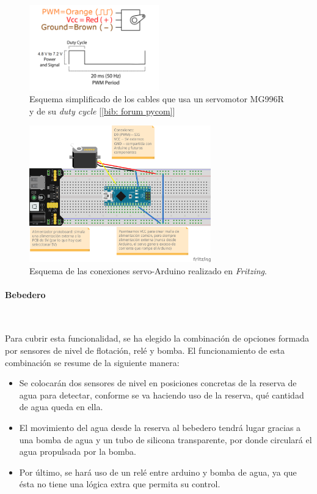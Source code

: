 \documentclass[12pt]{article}
\newcommand{\subsubsubsection}[1]{\paragraph{#1}\mbox{}\\}
\begin{document}
	\begin{figure}[h!]
		\begin{center}
			\includegraphics[width=0.5\textwidth]{img/servo_dutyCycle.png}
			\caption{Esquema simplificado de los cables que usa un servomotor MG996R y de su \textit{duty cycle} [\ref{bib: forum pycom}]}
			\label{Esquema conexiones servo}
		\end{center}
	\end{figure}
	
	\begin{figure}[h!]
		\begin{center}
			\includegraphics[width=0.7\textwidth]{img/servo_connections_v2_fritzing.png}
			\caption{Esquema de las conexiones servo-Arduino realizado en \textit{Fritzing}.}
			\label{Esquema conexiones servo Fritzing}
		\end{center}
	\end{figure}
	
	\pagebreak
	
	\subsubsubsection{Bebedero}
	\label{subsubsubsection: bebedero eleccion}
		
	\noindent Para cubrir esta funcionalidad, se ha elegido la combinación de opciones formada por sensores de nivel de flotación, relé y bomba. El funcionamiento de esta combinación se resume de la siguiente manera: 
	
	\begin{itemize}
		\item Se colocarán dos sensores de nivel en posiciones  concretas de la reserva de agua para detectar, conforme se va haciendo uso de la reserva, qué cantidad de agua queda en ella.
		\item El movimiento del agua desde la reserva al bebedero tendrá lugar gracias a una bomba de agua y un tubo de silicona transparente, por donde circulará el agua propulsada por la bomba.
		\item Por último, se hará uso de un relé entre arduino y bomba de agua, ya que ésta no tiene una lógica extra que permita su control.
	\end{itemize}
	
\end{document}
